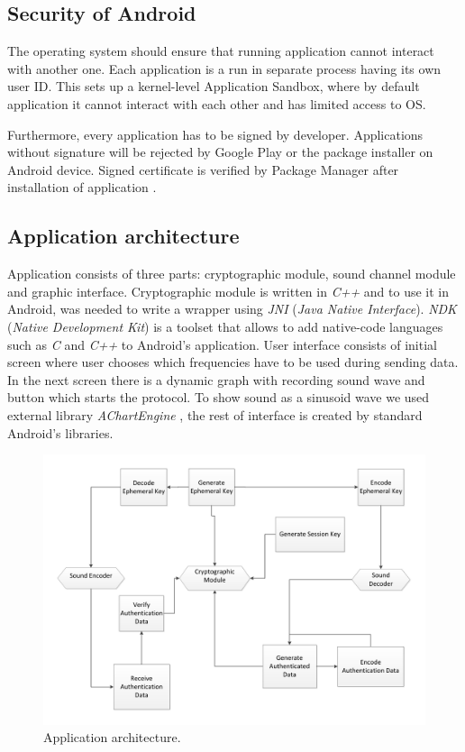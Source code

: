 \documentclass[11pt,titlepage]{article}
\theoremstyle{plain}
\begin{document}
\subsection{Security of Android}

The operating system should ensure that running application cannot interact with another one. Each application is a run in separate process having its own user ID. This sets up a kernel-level Application Sandbox, where by default application it cannot interact with each other and has limited access to OS.

\vspace{5mm}

Furthermore, every application has to be signed by developer. Applications without signature will be rejected by Google Play or the package installer on Android device. Signed certificate is verified by Package Manager after installation of application \cite{android_sec}.

\subsection{Application architecture}

Application consists of three parts: cryptographic module, sound channel module and graphic interface. Cryptographic module is written in \textit{C++} and to use it in Android, was needed to write a wrapper using \textit{JNI} (\textit{Java Native Interface}). \textit{NDK} (\textit{Native Development Kit}) is a toolset that allows to add native-code languages such as \textit{C} and \textit{C++} to Android's application. User interface consists of initial screen where user chooses which frequencies have to be used during sending data. In the next screen there is a dynamic graph with recording sound wave and button which starts the protocol. To show sound as a sinusoid wave we used external library \textit{AChartEngine} \cite{chart_eng}, the rest of interface is created by standard Android's libraries.

\vspace{5mm}

\begin{figure}[H]
	\centering
	\includegraphics[width=1\textwidth]{img/Architecture_pdf.pdf}
	\caption{Application architecture.}
\end{figure}
\end{document}
